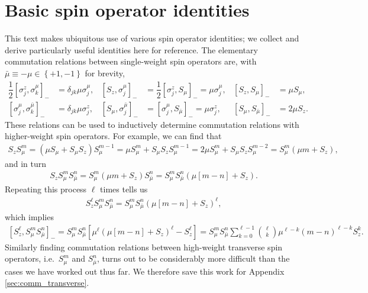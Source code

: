 \documentclass[aps,notitlepage,nofootinbib,11pt]{revtex4-1}
\newcommand{\f}[2]{\dfrac{#1}{#2}} %
\newcommand{\p}[1]{\left(#1\right)} %
\renewcommand{\sp}[1]{\left[#1\right]} %
\renewcommand{\set}[1]{\left\{#1\right\}} %
\newcommand{\bmu}{{\bar\mu}}
\newcommand{\1}{\mathds{1}}
\begin{document}
\section{Basic spin operator identities}
\label{sec:identities}

This text makes ubiquitous use of various spin operator identities; we
collect and derive particularly useful identities here for reference.
The elementary commutation relations between single-weight spin
operators are, with $\bmu\equiv-\mu\in\set{+1,-1}$ for brevity,
\begin{align}
  \f12 \sp{\sigma_j^z,\sigma_k^\mu}_-
  &= \delta_{jk} \mu \sigma_j^\mu,
  &
  \sp{S_z,\sigma_j^\mu}_-
  &= \f12 \sp{\sigma_j^z,S_\mu}_- = \mu \sigma_j^\mu,
  &
  \sp{S_z,S_\mu}_-
  &= \mu S_\mu,
  \label{eq:comm_z_mu_base} \\
  \sp{\sigma_j^\mu,\sigma_k^\bmu}_-
  &= \delta_{jk} \mu \sigma_j^z,
  &
  \sp{S_\mu,\sigma_j^\bmu}_-
  &= \sp{\sigma_j^\mu,S_\bmu}_- = \mu \sigma_j^z,
  &
  \sp{S_\mu,S_\bmu}_-
  &= 2 \mu S_z.
  \label{eq:comm_mu_base}
\end{align}
These relations can be used to inductively determine commutation
relations with higher-weight spin operators.  For example, we can find
that
\begin{align}
  S_z S_\mu^m
  = \p{\mu S_\mu + S_\mu S_z} S_\mu^{m-1}
  = \mu S_\mu^m + S_\mu S_z S_\mu^{m-1}
  = 2 \mu S_\mu^m + S_\mu S_z S_\mu^{m-2}
  = S_\mu^m \p{\mu m + S_z},
  \label{eq:push_z_mu_single}
\end{align}
and in turn
\begin{align}
  S_z S_\mu^m S_\bmu^n
  = S_\mu^m \p{\mu m + S_z} S_\bmu^n
  = S_\mu^m S_\bmu^n \p{\mu\sp{m - n} + S_z}.
\end{align}
Repeating this process $\ell$ times tells us
\begin{align}
  S_z^\ell S_\mu^m S_\bmu^n
  = S_\mu^m S_\bmu^n \p{\mu\sp{m - n} + S_z}^\ell,
  \label{eq:push_z_mu}
\end{align}
which implies
\begin{align}
  \sp{S_z^\ell, S_\mu^m S_\bmu^n}_-
  = S_\mu^m S_\bmu^n \sp{\mu^\ell \p{\mu\sp{m - n} + S_z}^\ell - S_z^\ell}
  = S_\mu^m S_\bmu^n  \sum_{k=0}^{\ell-1} {\ell \choose k}
  \mu^{\ell-k} \p{m-n}^{\ell-k} S_z^k.
  \label{eq:comm_z_mu}
\end{align}
Similarly finding commutation relations between high-weight transverse
spin operators, i.e.~$S_\mu^m$ and $S_\bmu^n$, turns out to be
considerably more difficult than the cases we have worked out thus
far.  We therefore save this work for Appendix
\ref{sec:comm_transverse}.
\end{document}
